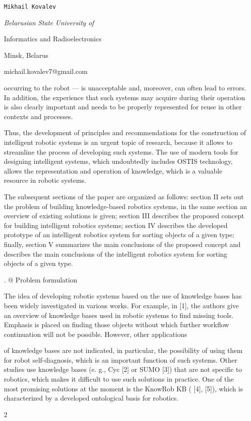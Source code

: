 \documentclass[a4paper]{article}
\makeatletter
\newcommand*{\rom}[1]{\expandafter\@slowromancap\romannumeral #1@}
\makeatother
\begin{document}
\begin{multicols}{2}
\centerline{\texttt{Mikhail Kovalev}}\par
\centerline{\textit{Belarusian State University of}}
\centerline{Informatics and Radioelectronics}
\centerline{Minsk, Belarus}
\centerline{michail.kovalev7@gmail.com}
\vspace{5mm}



occurring to the robot — is unacceptable and, moreover,
can often lead to errors. In addition, the experience that
such systems may acquire during their operation is also
clearly important and needs to be properly represented
for reuse in other contexts and processes.\par
Thus, the development of principles and recommendations for the construction of intelligent robotic systems
is an urgent topic of research, because it allows to
streamline the process of developing such systems. The
use of modern tools for designing intelligent systems,
which undoubtedly includes OSTIS technology, allows
the representation and operation of knowledge, which is
a valuable resource in robotic systems.\par
The subsequent sections of the paper are organized
as follows: section II sets out the problem of building
knowledge-based robotics systems, in the same section
an overview of existing solutions is given; section III
describes the proposed concept for building intelligent
robotics systems; section IV describes the developed
prototype of an intelligent robotics system for sorting
objects of a given type; finally, section V summarizes the
main conclusions of the proposed concept and describes
the main conclusions of the intelligent robotics system
for sorting objects of a given type.
\normalsize
\vspace{2mm}

\centerline{\rom{2. } \space Problem formulation}
\vspace{2mm}

The idea of developing robotic systems based on the
use of knowledge bases has been widely investigated in
various works. For example, in [1], the authors give an
overview of knowledge bases used in robotic systems
to find missing tools. Emphasis is placed on finding
those objects without which further workflow continuation will not be possible. However, other applications\par
of knowledge bases are not indicated, in particular, the
possibility of using them for robot self-diagnosis, which
is an important function of such systems. Other studies
use knowledge bases (e. g., Cyc [2] or SUMO [3]) that
are not specific to robotics, which makes it difficult to
use such solutions in practice. One of the most promising
solutions at the moment is the KnowRob KB ( [4], [5]),
which is characterized by a developed ontological basis
for robotics.

 

\end{multicols}{2}
\end{document}
